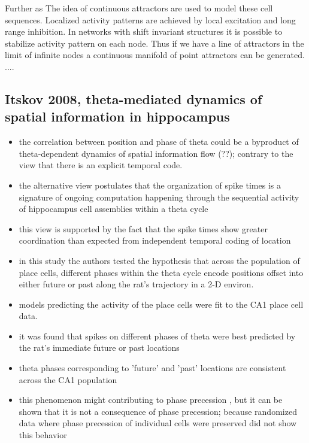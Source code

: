 Further as 
The idea of continuous attractors are used to model these cell sequences. Localized activity patterns are achieved by local excitation and long range inhibition. In networks  with shift invariant structures it is possible to stabilize activity pattern on each node. Thus if we have a line of attractors in the limit of infinite nodes a continuous manifold of point attractors can be generated.  ....


\subsection{Itskov 2008, theta-mediated dynamics of spatial information in hippocampus}
\begin{itemize}
\item the correlation between position and phase of theta could be a byproduct of theta-dependent dynamics of spatial information flow (??); contrary to the view that there is an explicit temporal code.
\item the alternative view postulates that the organization of spike times is a signature of ongoing computation happening through the sequential activity of hippocampus cell assemblies within a theta cycle
\item this view is supported by the fact that the spike times show greater coordination than expected from independent temporal coding of location
\item in this study the authors tested the hypothesis that across the population of place cells, different phases within the theta cycle encode positions offset into either future or past along the rat's trajectory in a 2-D environ.
\item models predicting the activity of the place cells were fit to the CA1 place cell data. 
\item it was found that spikes on different phases of theta were best predicted by the rat's immediate future or past locations
\item theta phases corresponding to 'future' and 'past' locations are consistent across the CA1 population
\item this phenomenon might contributing to phase precession , but it can be shown that it is not a consequence of phase precession; because randomized data where phase precession of individual cells were preserved did not show this behavior

\end{itemize}

